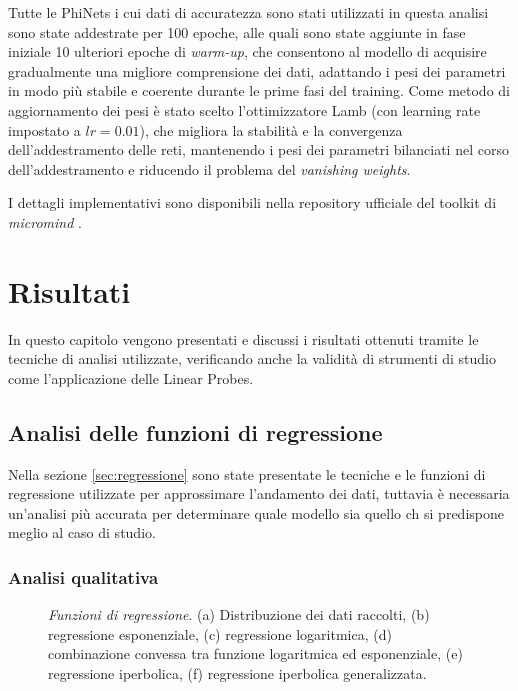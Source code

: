 Tutte le PhiNets i cui dati di accuratezza sono stati utilizzati in questa analisi sono state addestrate per 100 epoche, alle quali sono state aggiunte in fase iniziale 10 ulteriori epoche di \textit{warm-up}, che consentono al modello di acquisire gradualmente una migliore comprensione dei dati, adattando i pesi dei parametri in modo più stabile e coerente durante le prime fasi del training. Come metodo di aggiornamento dei pesi è stato scelto l'ottimizzatore Lamb \cite{lamb} (con learning rate impostato a $lr=0.01$), che migliora la stabilità e la convergenza dell'addestramento delle reti, mantenendo i pesi dei parametri bilanciati nel corso dell'addestramento e riducendo il problema del \textit{vanishing weights}.

I dettagli implementativi sono disponibili nella repository ufficiale del toolkit di \textit{micromind} \cite{micromind}.

\newpage
\chapter{Risultati}
\label{cha:risultati}

In questo capitolo vengono presentati e discussi i risultati ottenuti tramite le tecniche di analisi utilizzate, verificando anche la validità di strumenti di studio come l'applicazione delle Linear Probes.

\section{Analisi delle funzioni di regressione}

Nella sezione \ref{sec:regressione} sono state presentate le tecniche e le funzioni di regressione utilizzate per approssimare l'andamento dei dati, tuttavia è necessaria un'analisi più accurata per determinare quale modello sia quello ch si predispone meglio al caso di studio.

\subsection{Analisi qualitativa}

\begin{figure}[ht]
    \centering
    \quad
    \quad
    \quad
    \quad
    \quad
    \quad
    \caption{\textit{Funzioni di regressione}. (a) Distribuzione dei dati raccolti, (b) regressione esponenziale, (c) regressione logaritmica, (d) combinazione convessa tra funzione logaritmica ed esponenziale, (e) regressione iperbolica, (f) regressione iperbolica generalizzata.}
    \label{fig:qualitativa}
\end{figure}

